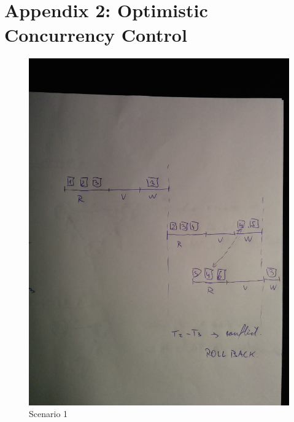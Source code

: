 \documentclass{article}      %
\begin{document}
\section*{\\Appendix 2: Optimistic Concurrency Control}
\begin{figure}[ht!]
\centering
 \includegraphics[scale=.15]{q2-1}
\caption{Scenario 1 \label{overflow}}
\end{figure}

\newpage
\end{document}

